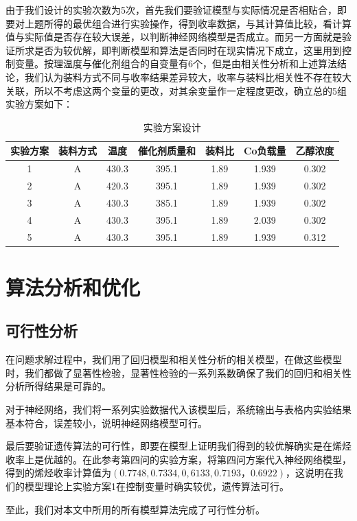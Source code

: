 \documentclass{article}
\begin{document}
	由于我们设计的实验次数为5次，首先我们要验证模型与实际情况是否相贴合，即要对上题所得的最优组合进行实验操作，得到收率数据，与其计算值比较，看计算值与实际值是否存在较大误差，以判断神经网络模型是否成立。而另一方面就是验证所求是否为较优解，即判断模型和算法是否同时在现实情况下成立，这里用到控制变量。按理温度与催化剂组合的自变量有6个，但是由相关性分析和上述算法结论，我们认为装料方式不同与收率结果差异较大，收率与装料比相关性不存在较大关联，所以不考虑这两个变量的更改，对其余变量作一定程度更改，确立总的5组实验方案如下：
	\begin{table}[!h]
		\centering
		\caption{实验方案设计}
		\begin{tabular}{|c|c|c|c|c|c|c|}
			\hline
			实验方案 & 装料方式 & 温度    & 催化剂质量和 & 装料比  & Co负载量 & 乙醇浓度  \\ \hline
			1    & A    & 430.3 & 395.1  & 1.89 & 1.939 & 0.302 \\ \hline
			2    & A    & 420.3 & 395.1  & 1.89 & 1.939 & 0.302 \\ \hline
			3    & A    & 430.3 & 385.1  & 1.89 & 1.939 & 0.302 \\ \hline
			4    & A    & 430.3 & 395.1  & 1.89 & 2.039 & 0.302 \\ \hline
			5    & A    & 430.3 & 395.1  & 1.89 & 1.939 & 0.312 \\ \hline
		\end{tabular}
	\end{table}
	\section{算法分析和优化}
	\subsection{可行性分析}
	在问题求解过程中，我们用了回归模型和相关性分析的相关模型，在做这些模型时，我们都做了显著性检验，显著性检验的一系列系数确保了我们的回归和相关性分析所得结果是可靠的。
	
	对于神经网络，我们将一系列实验数据代入该模型后，系统输出与表格内实验结果基本符合，误差较小，说明神经网络模型可行。
	
	最后要验证遗传算法的可行性，即要在模型上证明我们得到的较优解确实是在烯烃收率上是优越的。在此参考第四问的实验方案，将第四问方案代入神经网络模型，得到的烯烃收率计算值为$(0.7748,0.7334,0,6133,0.7193，0.6922)$，这说明在我们的模型理论上实验方案1在控制变量时确实较优，遗传算法可行。
	
	至此，我们对本文中所用的所有模型算法完成了可行性分析。
	
\end{document}
